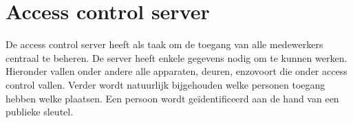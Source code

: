 \section{Access control server}
De access control server heeft als taak om de toegang van alle medewerkers
centraal te beheren. De server heeft enkele gegevens nodig om te kunnen werken.
Hieronder vallen onder andere alle apparaten, deuren, enzovoort die onder access
control vallen. Verder wordt natuurlijk bijgehouden welke personen toegang
hebben welke plaatsen. Een persoon wordt geïdentificeerd aan de hand van een
publieke sleutel.
